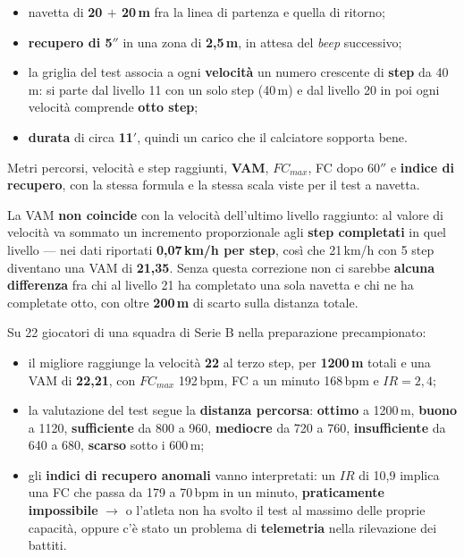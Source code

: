 \begin{itemize}
  \item navetta di \textbf{20 $+$ 20\,m} fra la linea di partenza e quella di ritorno;
  \item \textbf{recupero di 5$''$} in una zona di \textbf{2,5\,m}, in attesa del \textit{beep}
    successivo;
  \item la griglia del test associa a ogni \textbf{velocità} un numero crescente di \textbf{step} da
    40\,m: si parte dal livello 11 con un solo step (40\,m) e dal livello 20 in poi ogni velocità
    comprende \textbf{otto step};
  \item \textbf{durata} di circa \textbf{11$'$}, quindi un carico che il calciatore sopporta bene.
\end{itemize}

Metri percorsi, velocità e step raggiunti, \textbf{VAM}, $FC_{max}$, FC dopo 60$''$ e
\textbf{indice di recupero}, con la stessa formula e la stessa scala viste per il test a navetta.

La VAM \textbf{non coincide} con la velocità dell'ultimo livello raggiunto: al valore di velocità va
sommato un incremento proporzionale agli \textbf{step completati} in quel livello --- nei dati
riportati \textbf{0,07\,km/h per step}, così che 21\,km/h con 5 step diventano una VAM di
\textbf{21,35}. Senza questa correzione non ci sarebbe \textbf{alcuna differenza} fra chi al livello
21 ha completato una sola navetta e chi ne ha completate otto, con oltre \textbf{200\,m} di scarto
sulla distanza totale.

Su 22 giocatori di una squadra di Serie B nella preparazione precampionato:
\begin{itemize}
  \item il migliore raggiunge la velocità \textbf{22} al terzo step, per \textbf{1200\,m} totali e
    una VAM di \textbf{22,21}, con $FC_{max}$ 192\,bpm, FC a un minuto 168\,bpm e $IR = 2{,}4$;
  \item la valutazione del test segue la \textbf{distanza percorsa}: \textbf{ottimo} a 1200\,m,
    \textbf{buono} a 1120, \textbf{sufficiente} da 800 a 960, \textbf{mediocre} da 720 a 760,
    \textbf{insufficiente} da 640 a 680, \textbf{scarso} sotto i 600\,m;
  \item gli \textbf{indici di recupero anomali} vanno interpretati: un $IR$ di 10,9 implica una FC
    che passa da 179 a 70\,bpm in un minuto, \textbf{praticamente impossibile} $\rightarrow$ o
    l'atleta non ha svolto il test al massimo delle proprie capacità, oppure c'è stato un problema
    di \textbf{telemetria} nella rilevazione dei battiti.
\end{itemize}
